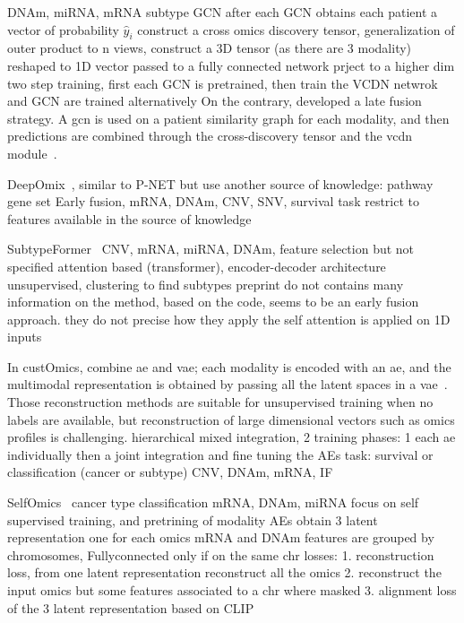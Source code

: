 \documentclass[../main.tex]{subfiles}
\begin{document}
		\cite{MOGONET} DNAm, miRNA, mRNA subtype GCN
		after each GCN obtains each patient a vector of probability \(\hat{y}_{i}\)
		construct a cross omics discovery tensor, generalization of outer product to n views, construct a 3D tensor (as there are 3 modality) reshaped to 1D vector passed to a fully connected network
		prject to a higher dim
		two step training, first each GCN is pretrained, then train the VCDN netwrok and GCN are trained alternatively
		On the contrary, \citeauthor{MOGONET} developed a late fusion strategy.
		A \gls{gcn} is used on a patient similarity graph for each modality, and then predictions are combined through the cross-discovery tensor and the \gls{vcdn} module~\cite{MOGONET}.

		DeepOmix~\cite{DeepOmix}, similar to P-NET but use another source of knowledge: pathway gene set
		Early fusion, mRNA, DNAm, CNV, SNV, survival task
		restrict to features available in the source of knowledge

		SubtypeFormer~\cite{SubtypeFormer}
		CNV, mRNA, miRNA, DNAm, feature selection but not specified
		attention based (transformer), encoder-decoder architecture
		unsupervised, clustering to find subtypes
		preprint do not contains many information on the method, based on the code, seems to be an early fusion approach.
		they do not precise how they apply the self attention is applied on 1D inputs

		In custOmics, \citeauthor{customics} combine \gls{ae} and \gls{vae}; each modality is encoded with an \gls{ae}, and the multimodal representation is obtained by passing all the latent spaces in a \gls{vae}~\cite{customics}.
		Those reconstruction methods are suitable for unsupervised training when no labels are available, but reconstruction of large dimensional vectors such as omics profiles is challenging.
		hierarchical mixed integration, 2 training phases: 1 each ae individually then a joint integration and fine tuning the AEs
		task: survival or classification (cancer or subtype)
		CNV, DNAm, mRNA, IF

		SelfOmics~\cite{selfOmics}
		cancer type classification
		mRNA, DNAm, miRNA
		focus on self supervised training, and pretrining of modality AEs
		obtain 3 latent representation one for each omics
		mRNA and DNAm features are grouped by chromosomes, Fullyconnected only if on the same chr
		losses:
		1. reconstruction loss, from one latent representation reconstruct all the omics
		2. reconstruct the input omics but some features associated to a chr where masked
		3. alignment loss of the 3 latent representation based on CLIP
\end{document}
